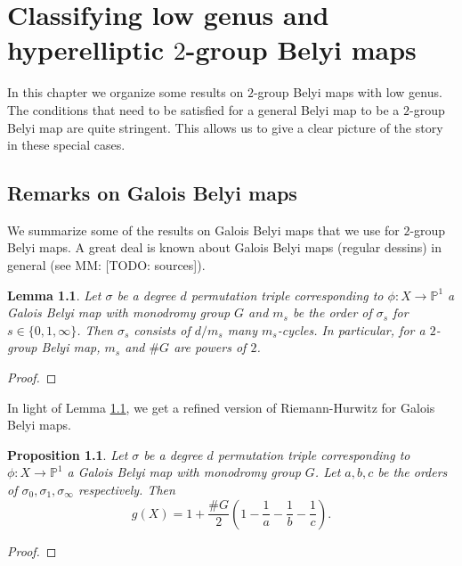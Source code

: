 \documentclass{dcthesis}
\newcommand{\PP}{\mathbb P}
\newcommand{\mm}[1]{{\color{blue} \sf MM: [#1]}}
\numberwithin{equation}{section}
\newtheorem{prop}[equation]{Proposition}
\newtheorem{lemma}[equation]{Lemma}
\theoremstyle{definition}
\theoremstyle{remark}
\begin{document}
\chapter{Classifying low genus and hyperelliptic $2$-group Belyi maps}{\label{chapter:classify}
  In this chapter we organize some results on $2$-group Belyi maps
  with low genus.
  The conditions that need to be satisfied for a general Belyi map
  to be a $2$-group Belyi map are quite stringent.
  This allows us to give a clear picture of the story
  in these special cases.
  \section{Remarks on Galois Belyi maps}{\label{sec:galoisbelyimaps}
    We summarize some of the results on Galois Belyi maps
    that we use for $2$-group Belyi maps.
    A great deal is known about Galois Belyi maps (regular dessins) in general
    (see \mm{TODO: sources}).
    \begin{lemma}\label{lem:regular}
      Let $\sigma$ be a degree $d$ permutation triple corresponding to
      $\phi\colon X\to\PP^1$ a Galois Belyi map with monodromy group $G$
      and
      $m_s$ be the order of $\sigma_s$ for $s\in\{0,1,\infty\}$.
      Then $\sigma_s$ consists of $d/m_s$ many $m_s$-cycles.
      In particular,
      for a $2$-group Belyi map,
      $m_s$ and $\#G$ are powers of $2$.
    \end{lemma}
    \begin{proof}
    \end{proof}
    In light of Lemma \ref{lem:regular},
    we get a refined version of Riemann-Hurwitz for Galois Belyi maps.
    \begin{prop}\label{prop:riemannhurwitzgalois}
      Let $\sigma$ be a degree $d$ permutation triple corresponding to
      $\phi\colon X\to\PP^1$ a Galois Belyi map with monodromy group $G$.
      Let $a,b,c$ be the orders of $\sigma_0,\sigma_1,\sigma_\infty$
      respectively.
      Then
      \begin{equation}\label{eqn:riemannhurwitzgalois}
        g(X) = 1+\frac{\#G}{2}\left(1-\frac{1}{a}-\frac{1}{b}-\frac{1}{c}\right).
      \end{equation}
    \end{prop}
    \begin{proof}
    \end{proof}
  }
}
\end{document}
